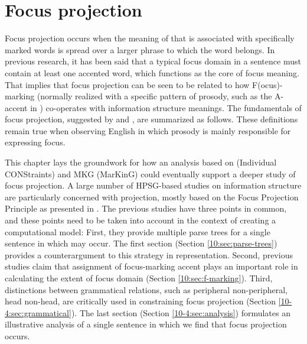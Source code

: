 \chapter{Focus projection}
\label{chapter10-4}
\setcounter{enums}{0}


Focus projection occurs when the meaning of
 that is associated with specifically marked words is
spread over a larger phrase to which the word belongs.  In previous
research, it has been said that a typical focus domain in a sentence
must contain at least one accented word, which functions as the core
of focus meaning. That implies that focus projection can be seen to be
related to how F(ocus)-marking (normally realized with a specific
pattern of prosody, such as the A-accent in )
co-operates with information structure meanings. The
fundamentals of focus projection, suggested by
\citet{selkirk:84,selkirk:95} and \citet{buring:06}, are summarized as
follows.  These definitions remain true when observing English in
which prosody is mainly responsible for expressing focus.






This chapter lays the groundwork for how an analysis based on
 (Individual CONStraints) and
MKG (MarKinG) could eventually support a deeper study of focus
projection. A large number of HPSG-based studies on
information structure are particularly concerned with 
projection, mostly based on the Focus Projection Principle as
presented in .  The previous
studies have three points in common, and these points need to be taken
into account in the context of creating a computational model: First,
they provide multiple parse trees for a single sentence in which
 may occur.  The first section
(Section \ref{10:sec:parse-trees}) provides a counterargument to this strategy
in representation.  Second, previous studies claim that assignment of
focus-marking accent plays an important role in calculating the extent
of focus domain (Section \ref{10:sec:f-marking}). Third,
distinctions between grammatical relations, such as peripheral \vs
non-peripheral, head \vs non-head, are critically used in constraining
focus projection (Section \ref{10-4:sec:grammatical}). The last
section (Section \ref{10-4:sec:analysis}) formulates an illustrative analysis
of a single sentence in which we find that focus projection occurs.





